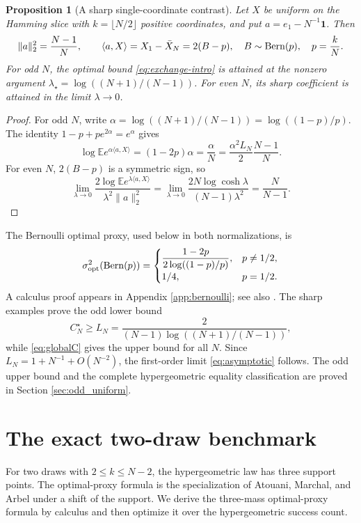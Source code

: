 \documentclass[11pt,a4paper]{article}
\newtheorem{proposition}[theorem]{Proposition}
\newcommand{\E}{\mathbb E}\newcommand{\R}{\mathbb R}\newcommand{\N}{\mathbb N}\newcommand{\one}{\mathbf1}
\begin{document}
\begin{proposition}[A sharp single-coordinate contrast]\label{prop:explicit_extremizer}
Let $X$ be uniform on the Hamming slice with $k=\lfloor N/2\rfloor$ positive coordinates, and put $a=e_1-N^{-1}\one$. Then
\[
 \|a\|_2^2=\frac{N-1}{N},\qquad
 \langle a,X\rangle=X_1-\bar X_N=2(B-p),
 \quad B\sim\operatorname{Bern}(p),\quad p=\frac{k}{N}.
\]
For odd $N$, the optimal bound \eqref{eq:exchange-intro} is attained at the nonzero argument $\lambda_\star=\log((N+1)/(N-1))$. For even $N$, its sharp coefficient is attained in the limit $\lambda\to0$.
\end{proposition}
\begin{proof}
For odd $N$, write $\alpha=\log((N+1)/(N-1))=\log((1-p)/p)$. The identity $1-p+pe^{2\alpha}=e^\alpha$ gives
\[
 \log\E e^{\alpha\langle a,X\rangle}
 =(1-2p)\alpha=\frac\alpha N
 =\frac{\alpha^2 L_N}{2}\frac{N-1}{N}.
\]
For even $N$, $2(B-p)$ is a symmetric sign, so
\[
 \lim_{\lambda\to0}\frac{2\log\E e^{\lambda\langle a,X\rangle}}
 {\lambda^2\|a\|_2^2}
 =\lim_{\lambda\to0}\frac{2N\log\cosh\lambda}{(N-1)\lambda^2}
 =\frac{N}{N-1}.
\]
\end{proof}

The Bernoulli optimal proxy, used below in both normalizations, is
\begin{equation}\label{eq:bernproxy}
 \sigma^2_{\mathrm{opt}}(\operatorname{Bern}(p))=
 \begin{cases}\displaystyle\frac{1-2p}{2\log((1-p)/p)},&p\ne1/2,\\[5pt]1/4,&p=1/2.
 \end{cases}
\end{equation}
A calculus proof appears in Appendix \ref{app:bernoulli}; see also \cite{ArbelMarchalNguyen}. The sharp examples prove the odd lower bound
\begin{equation}\label{eq:oddL}
 C_N^\star\ge L_N=\frac{2}{(N-1)\log((N+1)/(N-1))},
\end{equation}
while \eqref{eq:globalC} gives the upper bound for all $N$. Since $L_N=1+N^{-1}+O(N^{-2})$, the first-order limit \eqref{eq:asymptotic} follows. The odd upper bound and the complete hypergeometric equality classification are proved in Section \ref{sec:odd_uniform}.



\section{The exact two-draw benchmark}\label{sec:twodraw}
For two draws with $2\le k\le N-2$, the hypergeometric law has three support points. The optimal-proxy formula is the specialization of Atouani, Marchal, and Arbel \cite[Theorem 3.2 and Corollary 3.3]{AtouaniMarchalArbel} under a shift of the support. We derive the three-mass optimal-proxy formula by calculus and then optimize it over the hypergeometric success count.
\end{document}
